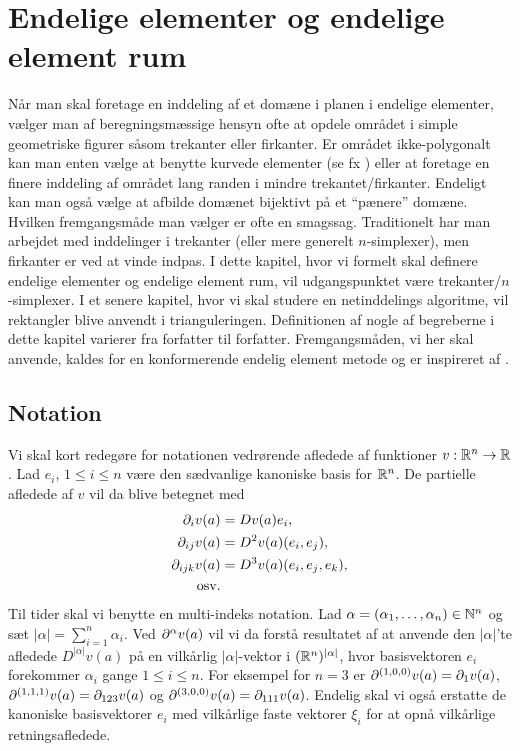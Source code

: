 \chapter{Endelige elementer og endelige element rum}

Når man skal foretage en inddeling af et domæne i planen i endelige
elementer, vælger man af beregningsmæssige hensyn ofte at opdele
området i simple geometriske figurer såsom trekanter eller firkanter. 
Er området ikke-polygonalt kan
man enten vælge at benytte kurvede elementer (se fx
\cite{ciarlet78,johnson87}) eller at foretage en
finere inddeling af området lang randen i mindre trekantet/firkanter.
Endeligt kan man også vælge at afbilde domænet bijektivt på et
``pænere'' domæne. Hvilken fremgangsmåde man vælger er ofte en smagssag.
Traditionelt har man arbejdet med inddelinger i trekanter (eller mere
generelt $n$-simplexer), men firkanter er ved at vinde indpas. I dette
kapitel, hvor vi formelt skal definere endelige elementer og endelige
element rum, vil udgangspunktet være trekanter/$n$-simplexer. I et
senere kapitel, hvor vi skal studere en netinddelings algoritme, vil
rektangler blive anvendt i trianguleringen. Definitionen af nogle af
begreberne i dette kapitel varierer fra forfatter til forfatter.
Fremgangsmåden, vi her skal anvende, kaldes for en konformerende
endelig element metode og er inspireret af \cite{ciarlet78}.

\section{Notation}
Vi skal kort redegøre for notationen vedrørende afledede af funktioner
$v:\mathbb{R}^n \rightarrow \mathbb{R}$. Lad $e_i$, $1\leq i\leq n$ være den
sædvanlige kanoniske basis for $\mathbb{R}^n$. De partielle afledede af $v$
vil da blive betegnet med
\begin{align}
  \partial_i v(a) &= Dv(a)e_i, \\
  \partial_{ij} v(a) &= D^2 v(a)(e_i,e_j), \\
  \partial_{ijk} v(a) &= D^3 v(a)(e_i,e_j,e_k), \\
  \text{osv.} \notag  
\end{align}
Til tider skal vi benytte en multi-indeks notation. Lad
$\alpha=(\alpha_1,\ldots,\alpha_n)\in\mathbb{N}^n$ og sæt $|\alpha
|=\sum_{i=1}^n \alpha_i$. Ved $\partial^{\alpha} v(a)$ vil vi da forstå
resultatet af at anvende den $|\alpha |$'te afledede $D^{|\alpha
|}v(a)$ på en vilkårlig $|\alpha |$-vektor i $(\mathbb{R}^n)^{|\alpha |}$,
hvor basisvektoren $e_i$ forekommer $\alpha_i$ gange $1\leq i\leq n$.
For eksempel for $n=3$ er $\partial^{(1,0,0)} v(a)=\partial_1 v(a)$,
$\partial^{(1,1,1)}v(a)=\partial_{123}v(a)$ og $\partial^{(3,0,0)}v(a)=\partial_{111}v(a)$.
Endelig skal vi også erstatte de kanoniske basisvektorer $e_i$ med
vilkårlige faste vektorer $\xi_i$ for at opnå vilkårlige retningsafledede.
 
